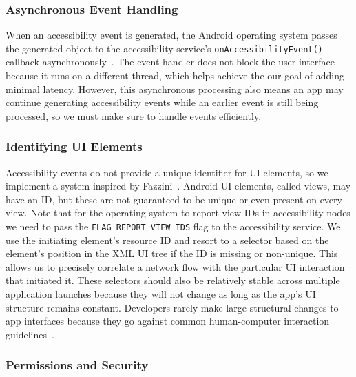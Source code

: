 
\subsubsection{Asynchronous Event Handling}
\label{sec:asynchronous-event-handling}

When an accessibility event is generated, the Android operating system passes
the generated object to the accessibility service's
\texttt{onAccessibilityEvent()} callback
asynchronously~\cite{googledevelopers2020}. The event handler does not block the
user interface because it runs on a different thread, which helps achieve the
our goal of adding minimal latency. However, this asynchronous processing also
means an app may continue generating accessibility events while an earlier event
is still being processed, so we must make sure to handle events efficiently.

\subsubsection{Identifying UI Elements}
\label{sec:identifying-ui-elements}

Accessibility events do not provide a unique identifier for UI elements, so we
implement a system inspired by Fazzini~\etal \cite{fazzini2017}. Android UI
elements, called views, may have an ID, but these are not guaranteed to be
unique or even present on every view. Note that for the operating system to
report view IDs in accessibility nodes we need to pass the
\texttt{FLAG\_REPORT\_VIEW\_IDS} flag to the accessibility service. We use the
initiating element's resource ID and resort to a selector based on the element's
position in the XML UI tree if the ID is missing or non-unique. This allows us
to precisely correlate a network flow with the particular UI interaction that
initiated it. These selectors should also be relatively stable across multiple
application launches because they will not change as long as the app's UI
structure remains constant.  Developers rarely make large structural changes to
app interfaces because they go against common human-computer interaction
guidelines~\cite{norman2013}.


\subsubsection{Permissions and Security}
\label{sec:accessibility-permissions}

